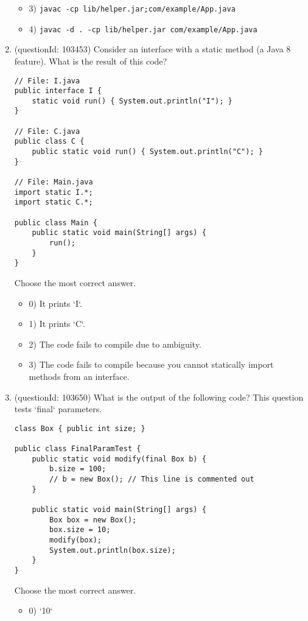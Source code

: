 \documentclass[12pt]{article}
\begin{document}
\begin{enumerate}[label=(\arabic*)]
\begin{itemize}
\item 3) \verb|javac -cp lib/helper.jar;com/example/App.java|

\item 4) \verb|javac -d . -cp lib/helper.jar com/example/App.java|

\end{itemize}
\item (questionId: 103453) Consider an interface with a static method (a Java 8 feature). What is the result of this code?
\begin{verbatim}
// File: I.java
public interface I {
    static void run() { System.out.println("I"); }
}

// File: C.java
public class C {
    public static void run() { System.out.println("C"); }
}

// File: Main.java
import static I.*;
import static C.*;

public class Main {
    public static void main(String[] args) {
        run();
    }
}
\end{verbatim}
Choose the most correct answer. 
\begin{itemize}
\item 0) It prints `I`.

\item 1) It prints `C`.

\item 2) The code fails to compile due to ambiguity.

\item 3) The code fails to compile because you cannot statically import methods from an interface.

\end{itemize}
\item (questionId: 103650) What is the output of the following code? This question tests `final` parameters.
\begin{verbatim}
class Box { public int size; }

public class FinalParamTest {
    public static void modify(final Box b) {
        b.size = 100;
        // b = new Box(); // This line is commented out
    }

    public static void main(String[] args) {
        Box box = new Box();
        box.size = 10;
        modify(box);
        System.out.println(box.size);
    }
}
\end{verbatim}
Choose the most correct answer. 
\begin{itemize}
\item 0) `10`


\end{itemize}
\end{enumerate}
\end{document}
